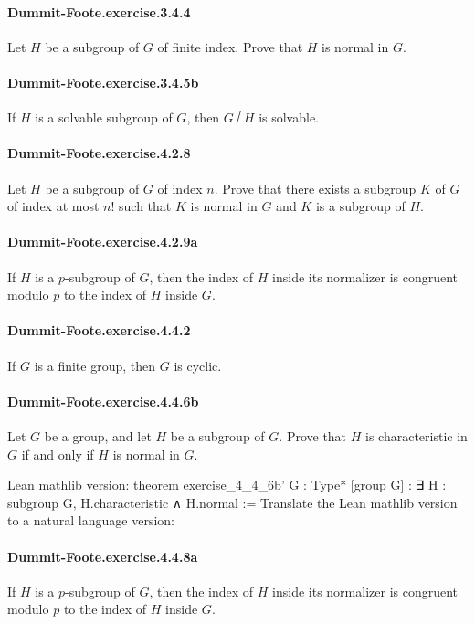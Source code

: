 \documentclass{article}
\begin{document}
\paragraph{Dummit-Foote.exercise.3.4.4} Let $H$ be a subgroup of $G$ of finite index. Prove that $H$ is normal in $G$.

\paragraph{Dummit-Foote.exercise.3.4.5b} If $H$ is a solvable subgroup of $G$, then $G ⧸ H$ is solvable.

\paragraph{Dummit-Foote.exercise.4.2.8} Let $H$ be a subgroup of $G$ of index $n$. Prove that there exists a subgroup $K$ of $G$ of index at most $n!$ such that $K$ is normal in $G$ and $K$ is a subgroup of $H$.

\paragraph{Dummit-Foote.exercise.4.2.9a} If $H$ is a $p$-subgroup of $G$, then the index of $H$ inside its normalizer is congruent modulo $p$ to the index of $H$ inside $G$.

\paragraph{Dummit-Foote.exercise.4.4.2} If $G$ is a finite group, then $G$ is cyclic.

\paragraph{Dummit-Foote.exercise.4.4.6b} Let $G$ be a group, and let $H$ be a subgroup of $G$. Prove that $H$ is characteristic in $G$ if and only if $H$ is normal in $G$.

Lean mathlib version:
theorem exercise_4_4_6b' {G : Type*} [group G] : 
  ∃ H : subgroup G, H.characteristic ∧ H.normal :=
Translate the Lean mathlib version to a natural language version: 

\paragraph{Dummit-Foote.exercise.4.4.8a} If $H$ is a $p$-subgroup of $G$, then the index of $H$ inside its normalizer is congruent modulo $p$ to the index of $H$ inside $G$.
\end{document}
